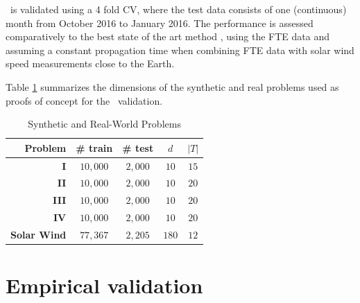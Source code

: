 \XX\ is validated using a 4 fold CV, where the test data consists of one (continuous) month from October 2016 to January 2016. The performance is assessed comparatively to the best state of the art method \citep{Poduval_2014,neuralnetsw}, using  the FTE data and assuming a constant propagation time when combining FTE data with solar wind speed measurements close to the Earth. 

Table \ref{tab:exp} summarizes the dimensions of the synthetic and real problems used as proofs of concept for the \XX\ validation.
\begin{table}[htbp]
  \caption{Synthetic and Real-World Problems}\label{tab:exp_data_info}
  \centering
  \begin{tabular}{ r c c c c}
  \hline
  Problem &  \# train & \# test & $d$ & $|T|$ \\
  \hline
  \textbf{I} & $10,000$ & $2,000$  & $10$ & $15$\\
  \textbf{II} & $10,000$ & $2,000$ & $10$ & $20$\\
  \textbf{III} & $10,000$ & $2,000$ & $10$ & $20$\\
  \textbf{IV} & $10,000$ & $2,000$ & $10$ & $20$\\
  \textbf{Solar Wind} & $77,367$ & $2,205$ & $180$ & $12$\\
  \hline
  \end{tabular}
  \label{tab:exp}
\end{table}

\section{Empirical validation}\label{sec:proofconcept}

